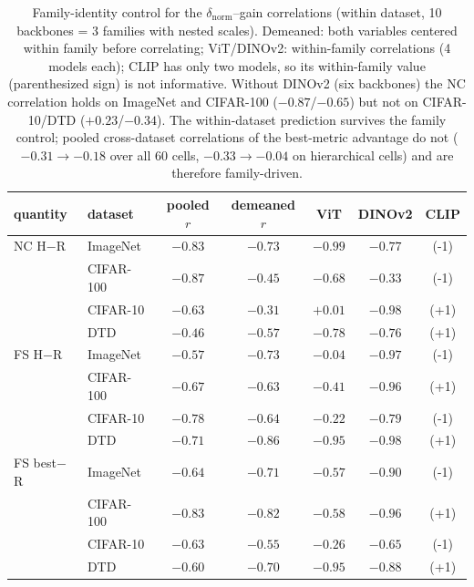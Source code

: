 \begin{table}[H]
\centering
\small
\begin{tabular}{llccccc}
\toprule
quantity & dataset & pooled $r$ & demeaned $r$ & ViT & DINOv2 & CLIP \\
\midrule
NC H$-$R & ImageNet & $-0.83$ & $-0.73$ & $-0.99$ & $-0.77$ & (-1) \\
 & CIFAR-100 & $-0.87$ & $-0.45$ & $-0.68$ & $-0.33$ & (-1) \\
 & CIFAR-10 & $-0.63$ & $-0.31$ & $+0.01$ & $-0.98$ & (+1) \\
 & DTD & $-0.46$ & $-0.57$ & $-0.78$ & $-0.76$ & (+1) \\
\midrule
FS H$-$R & ImageNet & $-0.57$ & $-0.73$ & $-0.04$ & $-0.97$ & (-1) \\
 & CIFAR-100 & $-0.67$ & $-0.63$ & $-0.41$ & $-0.96$ & (+1) \\
 & CIFAR-10 & $-0.78$ & $-0.64$ & $-0.22$ & $-0.79$ & (-1) \\
 & DTD & $-0.71$ & $-0.86$ & $-0.95$ & $-0.98$ & (+1) \\
\midrule
FS best$-$R & ImageNet & $-0.64$ & $-0.71$ & $-0.57$ & $-0.90$ & (-1) \\
 & CIFAR-100 & $-0.83$ & $-0.82$ & $-0.58$ & $-0.96$ & (+1) \\
 & CIFAR-10 & $-0.63$ & $-0.55$ & $-0.26$ & $-0.65$ & (-1) \\
 & DTD & $-0.60$ & $-0.70$ & $-0.95$ & $-0.88$ & (+1) \\
\bottomrule
\end{tabular}
\caption{Family-identity control for the $\delta_{\text{norm}}$--gain correlations (within dataset, 10 backbones = 3 families with nested scales). Demeaned: both variables centered within family before correlating; ViT/DINOv2: within-family correlations (4 models each); CLIP has only two models, so its within-family value (parenthesized sign) is not informative. Without DINOv2 (six backbones) the NC correlation holds on ImageNet and CIFAR-100 ($-0.87$/$-0.65$) but not on CIFAR-10/DTD ($+0.23$/$-0.34$). The within-dataset prediction survives the family control; pooled cross-dataset correlations of the best-metric advantage do not ($-0.31\to-0.18$ over all 60 cells, $-0.33\to-0.04$ on hierarchical cells) and are therefore family-driven.}
\label{tab:b12-familycorr}
\end{table}
